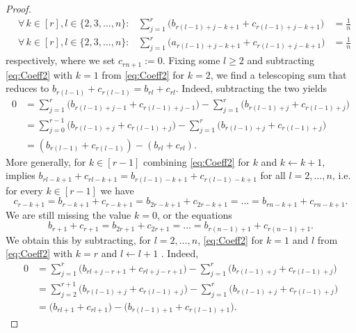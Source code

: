 \begin{proof}
\begin{align}
	&\forall \, k \in [r], l \in \{2,3,\ldots,n\} \colon &\sum_{j=1}^{r} \big( b_{r(l-1)+j - k + 1} + c_{r(l-1)+j - k + 1} \big) &= \frac{1}{n} \label{eq:Coeff2} \\
	&\forall \, k \in [r], l \in \{2,3,\ldots,n\} \colon &\sum_{j=1}^{r} \big( a_{r(l-1)+j - k + 1} + c_{r(l-1)+j - k + 1} \big) &= \frac{1}{n} \label{eq:Coeff3}
	\end{align}
respectively, where we set  $c_{r n + 1} := 0$. Fixing some $l \geq 2$ and subtracting \cref{eq:Coeff2} with $k = 1$ from \cref{eq:Coeff2} for $k= 2$, we find a telescoping sum that reduces to $b_{r(l-1)} + c_{r(l-1)} = b_{r l} + c_{r l}$. Indeed, subtracting the two yields
\begin{align*}
	0 &= \sum_{j=1}^{r} \big( b_{r(l-1)+j - 1} + c_{r(l-1)+j - 1} \big) - \sum_{j=1}^{r} \big( b_{r(l-1)+j} + c_{r(l-1)+j} \big) \\
	&= \sum_{j=0}^{r-1} \big( b_{r(l-1)+j } + c_{r(l-1)+j } \big)  - \sum_{j=1}^{r} \big( b_{r(l-1)+j} + c_{r(l-1)+j} \big) \\
	&= ( b_{r(l-1)} + c_{r(l-1)}) - (b_{r l} + c_{r l}).
	\end{align*}
More generally, for $k \in  [r-1]$ combining \eqref{eq:Coeff2} for $k$ and $k \leftarrow k + 1$, implies 
	$b_{r l - k + 1} + c_{r l - k + 1} = b_{r(l-1)- k + 1} + c_{r(l-1)- k + 1}$
for all $l = 2,\ldots,n$, i.e. for every $k \in [r - 1]$ we have
	\begin{equation}\label{eq:StackBandC1}
	c_{r - k + 1} = b_{r - k + 1} + c_{r - k+ 1} = b_{2r - k + 1} + c_{2r - k + 1} = \ldots = b_{r n - k + 1} + c_{r n - k + 1}.
	\end{equation}
We are still missing the value $k = 0$, or the equations 
\begin{equation}\label{eq:StackBandC2}
	b_{r+1} + c_{r+1} = b_{2r + 1} + c_{2r + 1} = \ldots = b_{r(n-1) + 1} + c_{r(n-1) + 1}.
	\end{equation}
We obtain this by subtracting, for $l = 2, \dots, n$,  \eqref{eq:Coeff2} for $k = 1$ and $l$ from \eqref{eq:Coeff2} with $k = r$ and $l \leftarrow l + 1$ . Indeed, 
\begin{align*}0 &= \sum_{j=1}^{r} \big( b_{r l+j - r + 1} + c_{r l +j - r + 1} \big) - \sum_{j=1}^{r} \big( b_{r(l-1)+j} + c_{r(l-1)+j} \big) \\
&= \sum_{j=2}^{r+1} \big( b_{r(l-1)+j } + c_{r(l-1) +j}\big) - \sum_{j=1}^{r} \big( b_{r(l-1)+j} + c_{r(l-1)+j} \big) \\
&= \big( b_{r l + 1} + c_{r l + 1}\big) - \big( b_{r(l-1)+1} + c_{r(l-1)+1} \big).
\end{align*}


\end{proof}
